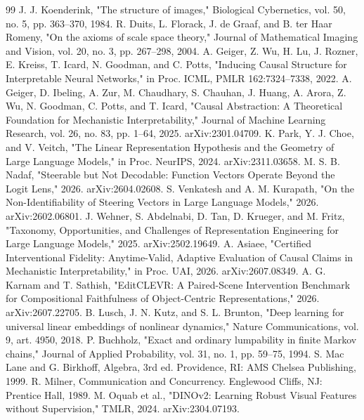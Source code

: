 \begin{thebibliography}{99}
\bibitem{} J. J. Koenderink, "The structure of images," Biological Cybernetics, vol. 50, no. 5, pp. 363--370, 1984.
\bibitem{} R. Duits, L. Florack, J. de Graaf, and B. ter Haar Romeny, "On the axioms of scale space theory," Journal of Mathematical Imaging and Vision, vol. 20, no. 3, pp. 267--298, 2004.
\bibitem{} A. Geiger, Z. Wu, H. Lu, J. Rozner, E. Kreiss, T. Icard, N. Goodman, and C. Potts, "Inducing Causal Structure for Interpretable Neural Networks," in Proc. ICML, PMLR 162:7324--7338, 2022.
\bibitem{} A. Geiger, D. Ibeling, A. Zur, M. Chaudhary, S. Chauhan, J. Huang, A. Arora, Z. Wu, N. Goodman, C. Potts, and T. Icard, "Causal Abstraction: A Theoretical Foundation for Mechanistic Interpretability," Journal of Machine Learning Research, vol. 26, no. 83, pp. 1--64, 2025. arXiv:2301.04709.
\bibitem{} K. Park, Y. J. Choe, and V. Veitch, "The Linear Representation Hypothesis and the Geometry of Large Language Models," in Proc. NeurIPS, 2024. arXiv:2311.03658.
\bibitem{} M. S. B. Nadaf, "Steerable but Not Decodable: Function Vectors Operate Beyond the Logit Lens," 2026. arXiv:2604.02608.
\bibitem{} S. Venkatesh and A. M. Kurapath, "On the Non-Identifiability of Steering Vectors in Large Language Models," 2026. arXiv:2602.06801.
\bibitem{} J. Wehner, S. Abdelnabi, D. Tan, D. Krueger, and M. Fritz, "Taxonomy, Opportunities, and Challenges of Representation Engineering for Large Language Models," 2025. arXiv:2502.19649.
\bibitem{} A. Asiaee, "Certified Interventional Fidelity: Anytime-Valid, Adaptive Evaluation of Causal Claims in Mechanistic Interpretability," in Proc. UAI, 2026. arXiv:2607.08349.
\bibitem{} A. G. Karnam and T. Sathish, "EditCLEVR: A Paired-Scene Intervention Benchmark for Compositional Faithfulness of Object-Centric Representations," 2026. arXiv:2607.22705.
\bibitem{} B. Lusch, J. N. Kutz, and S. L. Brunton, "Deep learning for universal linear embeddings of nonlinear dynamics," Nature Communications, vol. 9, art. 4950, 2018.
\bibitem{} P. Buchholz, "Exact and ordinary lumpability in finite Markov chains," Journal of Applied Probability, vol. 31, no. 1, pp. 59--75, 1994.
\bibitem{} S. Mac Lane and G. Birkhoff, Algebra, 3rd ed. Providence, RI: AMS Chelsea Publishing, 1999.
\bibitem{} R. Milner, Communication and Concurrency. Englewood Cliffs, NJ: Prentice Hall, 1989.
\bibitem{} M. Oquab et al., "DINOv2: Learning Robust Visual Features without Supervision," TMLR, 2024. arXiv:2304.07193.
\end{thebibliography}